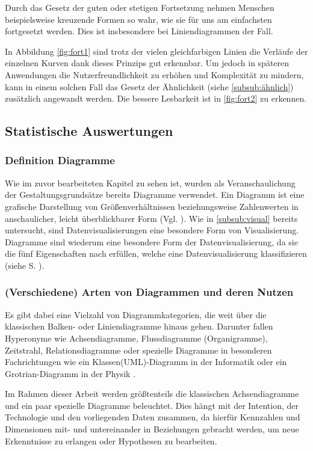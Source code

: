 Durch das Gesetz der guten oder stetigen Fortsetzung nehmen Menschen beispielsweise kreuzende Formen so wahr, wie sie für uns am einfachsten fortgesetzt werden.
Dies ist insbesondere bei Liniendiagrammen der Fall.

In Abbildung \ref{fig:fort1} sind trotz der vielen gleichfarbigen Linien die Verläufe der einzelnen Kurven dank dieses Prinzips gut erkennbar.
Um jedoch in späteren Anwendungen die Nutzerfreundlichkeit zu erhöhen und Komplexität zu mindern, kann in einem solchen Fall das Gesetz der Ähnlichkeit (siehe \ref{subsub:ähnlich}) zusätzlich angewandt werden.
Die bessere Lesbarkeit ist in \ref{fig:fort2} zu erkennen.

\subsection{Statistische Auswertungen}
\subsubsection{Definition Diagramme}
Wie im zuvor bearbeiteten Kapitel zu sehen ist, wurden als Veranschaulichung der Gestaltungsgrundsätze bereits Diagramme verwendet.
Ein Diagramm ist \glqq eine grafische Darstellung von Größenverhältnissen beziehungsweise Zahlenwerten in anschaulicher, leicht überblickbarer Form\grqq{} (Vgl. \cite{Dudenredaktion.2015}).
Wie in \ref{subsub:visual} bereits untersucht, sind Datenvisualisierungen eine besondere Form von Visualisierung.
Diagramme sind wiederum eine besondere Form der Datenvisualisierung, da sie die fünf Eigenschaften nach \cite{Card.2007} erfüllen, welche eine Datenvisualisierung klassifizieren (siehe S. \pageref{subsub:visual}). 

\subsubsection{(Verschiedene) Arten von Diagrammen und deren Nutzen}
Es gibt dabei eine Vielzahl von Diagrammkategorien, die weit über die klassischen Balken- oder Liniendiagramme hinaus gehen.
Darunter fallen Hyperonyme wie Achsendiagramme, Flussdiagramme (Organigramme), Zeitstrahl, Relationsdiagramme oder spezielle Diagramme in besonderen Fachrichtungen wie ein Klassen(UML)-Diagramm in der Informatik oder ein Grotrian-Diagramm in der Physik \cite{Bounford.2001, Duncan.2018, Engels.2015}.

Im Rahmen dieser Arbeit werden größtenteils die klassischen Achsendiagramme und ein paar spezielle Diagramme beleuchtet.
Dies hängt mit der Intention, der Technologie und den vorliegenden Daten zusammen, da hierfür Kennzahlen und Dimensionen mit- und untereinander in Beziehungen gebracht werden, um neue Erkenntnisse zu erlangen oder Hypothesen zu bearbeiten.

